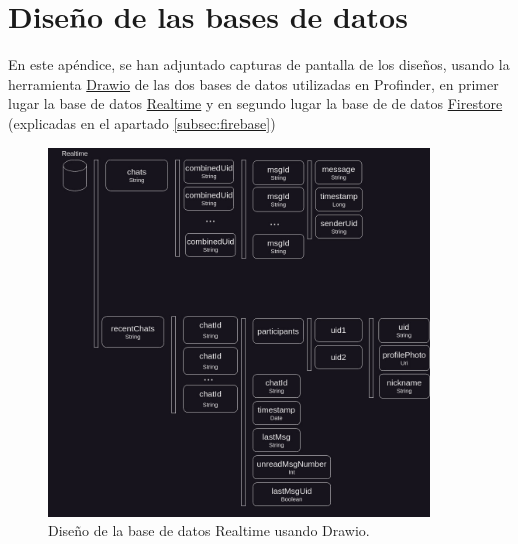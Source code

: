 \chapter{Diseño de las bases de datos}
\label{Appendix:bd_design}
En este apéndice, se han adjuntado capturas de pantalla de los diseños, usando la herramienta \hyperlink{subsec:drawio}{Drawio} de las dos bases de datos utilizadas en Profinder, en primer lugar la base de datos \hyperlink{subsec:realtime}{Realtime} y en segundo lugar la base de de datos \hyperlink{subsec:firestore}{Firestore} (explicadas en el apartado \ref{subsec:firebase})
\begin{figure}[ht]
	\centering
	\includegraphics[width = 0.9\textwidth]{Imagenes/drawio/realtime_db.jpg}
	\caption{Diseño de la base de datos Realtime usando Drawio.}
	\label{fig:realtime_db}
\end{figure}

